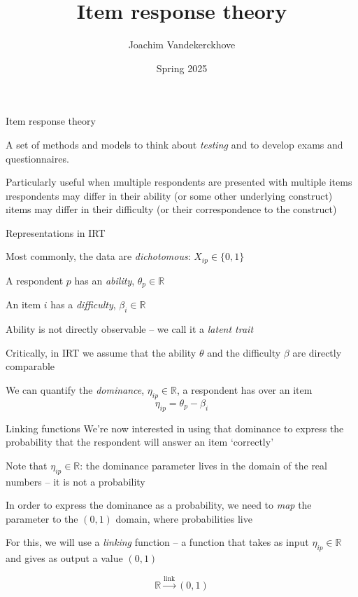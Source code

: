 \documentclass[aspectratio=169]{beamer}
\title{Item response theory}
\author{Joachim Vandekerckhove}
\date{Spring 2025}
\begin{document}
\maketitle

\begin{frame}[fragile]{Item response theory}

A set of methods and models to think about \emph{testing} and to develop exams and questionnaires.
\pause

Particularly useful when 
\bi
\i multiple respondents are presented with multiple items
\i respondents may differ in their ability (or some other underlying construct)
\i items may differ in their difficulty (or their correspondence to the construct)
\ei

\end{frame}



\begin{frame}[fragile]{Representations in IRT}

Most commonly, the data are \textit{dichotomous}: $X_{ip} \in \{0, 1\}$\pause

A respondent $p$ has an \emph{ability}, $\theta_p \in \mathbb{R}$\pause

An item $i$ has a \emph{difficulty}, $\beta_i \in \mathbb{R}$\pause

Ability is not directly observable -- we call it a \textit{latent trait} \cite{birnbaum1968some}\pause

Critically, in IRT we assume that the ability $\theta$ and the difficulty $\beta$ are directly comparable\pause

We can quantify the \emph{dominance}, $\eta_{ip} \in \mathbb{R}$, a respondent has over an item
$$\eta_{ip} = \theta_p - \beta_i$$



\end{frame}



\begin{frame}[fragile]{Linking functions}
We're now interested in using that dominance to express the probability that the respondent will answer an item `correctly'\pause

Note that $\eta_{ip} \in \mathbb{R}$: the dominance parameter lives in the domain of the real numbers -- it is not a probability\pause

In order to express the dominance as a probability, we need to \textit{map} the parameter to the   $(0,1)$ domain, where probabilities live\pause

For this, we will use a \textit{linking} function -- a function that takes as input $\eta_{ip} \in \mathbb{R}$ and gives as output a value $(0,1)$

$$\mathbb{R} \overset{\text{link}}{\longrightarrow} (0,1) $$

\end{frame}
\end{document}
